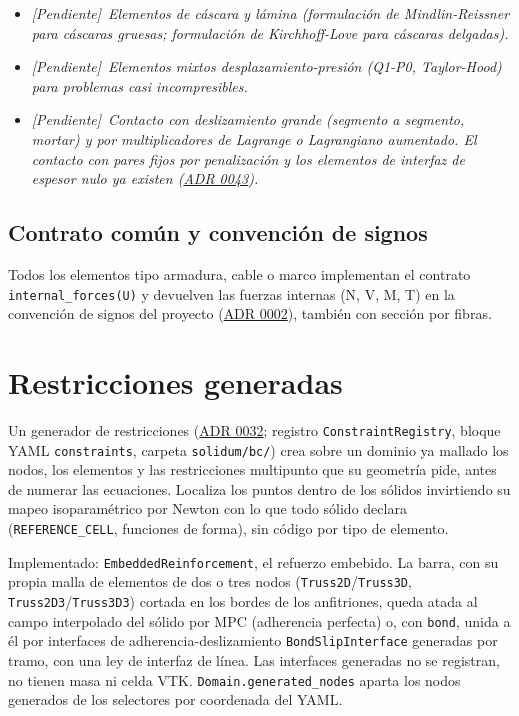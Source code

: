 \documentclass[11pt,oneside]{report}
\newcommand{\pendiente}[1]{\textcolor{pendienteorange}{\textit{[Pendiente]}~\textcolor{pendienteorange}{\textit{#1}}}}
\begin{document}
\begin{itemize}
  \item \pendiente{Elementos de cáscara y lámina (formulación de Mindlin-Reissner para cáscaras gruesas; formulación de Kirchhoff-Love para cáscaras delgadas).}
  \item \pendiente{Elementos mixtos desplazamiento-presión (Q1-P0, Taylor-Hood) para problemas casi incompresibles.}
  \item \pendiente{Contacto con deslizamiento grande (segmento a segmento, \textit{mortar}) y por multiplicadores de Lagrange o Lagrangiano aumentado. El contacto con pares fijos por penalización y los elementos de interfaz de espesor nulo ya existen (\hyperref[adr:0043]{ADR 0043}).}
\end{itemize}

\subsection{Contrato común y convención de signos}

Todos los elementos tipo armadura, cable o marco implementan el contrato \texttt{internal\_\allowbreak{}forces(U)} y devuelven las fuerzas internas (N, V, M, T) en la convención de signos del proyecto (\hyperref[adr:0002]{ADR 0002}), también con sección por fibras.

\section{Restricciones generadas}

Un generador de restricciones (\hyperref[adr:0032]{ADR 0032}; registro \texttt{ConstraintRegistry}, bloque YAML \texttt{constraints}, carpeta \texttt{solidum/bc/}) crea sobre un dominio ya mallado los nodos, los elementos y las restricciones multipunto que su geometría pide, antes de numerar las ecuaciones. Localiza los puntos dentro de los sólidos invirtiendo su mapeo isoparamétrico por Newton con lo que todo sólido declara (\texttt{REFERENCE\_CELL}, funciones de forma), sin código por tipo de elemento.

Implementado: \texttt{EmbeddedReinforcement}, el refuerzo embebido. La barra, con su propia malla de elementos de dos o tres nodos (\texttt{Truss2D}/\texttt{Truss3D}, \texttt{Truss2D3}/\texttt{Truss3D3}) cortada en los bordes de los anfitriones, queda atada al campo interpolado del sólido por MPC (adherencia perfecta) o, con \texttt{bond}, unida a él por interfaces de adherencia-deslizamiento \texttt{BondSlipInterface} generadas por tramo, con una ley de interfaz de línea. Las interfaces generadas no se registran, no tienen masa ni celda VTK. \texttt{Domain.\allowbreak{}generated\_\allowbreak{}nodes} aparta los nodos generados de los selectores por coordenada del YAML.
\end{document}
